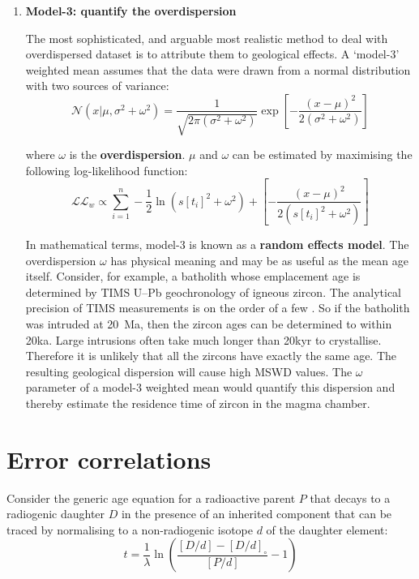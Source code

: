 \begin{refsection}
\begin{enumerate}
\item\textbf{Model-3: quantify the overdispersion}

  The most sophisticated, and arguable most realistic method to deal
  with overdispersed dataset is to attribute them to geological
  effects. A `model-3' weighted mean assumes that the data were drawn
  from a normal distribution with two sources of variance:
  \begin{equation}
    \mathcal{N}(x|\mu,\sigma^2+\omega^2) =
    \frac{1}{\sqrt{2\pi\left(\sigma^2+\omega^2\right)}}
    \exp\!\left[-\frac{(x-\mu)^2}{2\left(\sigma^2 + \omega^2 \right)}\right]
    \label{eq:overdispersion}
  \end{equation}

\noindent where $\omega$ is the \textbf{overdispersion}. $\mu$ and
$\omega$ can be estimated by maximising the following log-likelihood
function:
  \begin{equation}
    \mathcal{LL}_w \propto \sum\limits_{i=1}^{n}
    - \frac{1}{2}\ln\!\left(s[t_i]^2+\omega^2\right)
    + \left[-\frac{(x-\mu)^2}{2\left(s[t_i]^2 + \omega^2 \right)}\right]
    \label{eq:wtdmean-model-3}
  \end{equation}

In mathematical terms, model-3 is known as a \textbf{random effects
  model}. The overdispersion $\omega$ has physical meaning and may be
as useful as the mean age itself. Consider, for example, a batholith
whose emplacement age is determined by TIMS U--Pb geochronology of
igneous zircon. The analytical precision of TIMS measurements is on
the order of a few \textperthousand. So if the batholith was intruded
at 20~Ma, then the zircon ages can be determined to within 20ka. Large
intrusions often take much longer than 20kyr to crystallise. Therefore
it is unlikely that all the zircons have exactly the same age.  The
resulting geological dispersion will cause high MSWD values.  The
$\omega$ parameter of a model-3 weighted mean would quantify this
dispersion and thereby estimate the residence time of zircon in the
magma chamber.

\end{enumerate}

\section{Error correlations}
\label{sec:errorcorrelations}

Consider the generic age equation for a radioactive parent $P$
that decays to a radiogenic daughter $D$ in the presence of
an inherited component that can be traced by normalising to
a non-radiogenic isotope $d$ of the daughter element:
\begin{equation}
  t = \frac{1}{\lambda}
  \ln\left(\frac{\left[{D}/{d}\right]-\left[{D}/{d}\right]_\circ}
          {\left[{P}/{d}\right]} - 1\right)
\end{equation}


\end{refsection}

